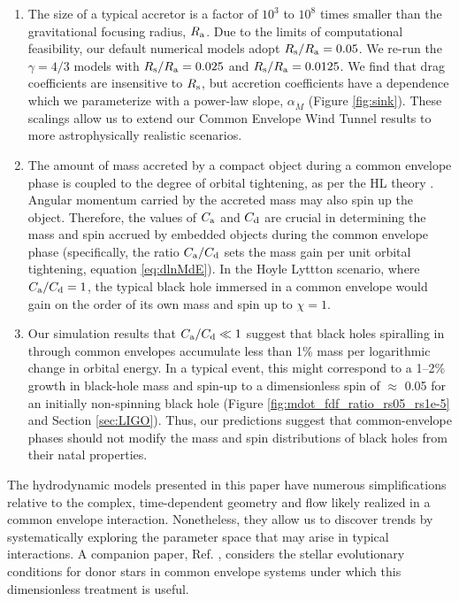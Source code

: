 \begin{enumerate}
\item The size of a typical accretor is a factor of $10^3$ to $10^8$ times smaller than the gravitational focusing radius, $R_{\rm a}$. Due to the limits of computational feasibility, our default numerical models adopt $R_{\rm s}/ R_{\rm a}=0.05$. We re-run the $\gamma=4/3$ models with $R_{\rm s}/ R_{\rm a}=0.025$ and $R_{\rm s}/ R_{\rm a}=0.0125$. We find that drag coefficients are insensitive to $R_{\rm s}$, but accretion coefficients have a dependence which we parameterize with a power-law slope, $\alpha_{\dot M}$ (Figure \ref{fig:sink}).
These scalings allow us to extend our Common Envelope Wind Tunnel results to more astrophysically realistic scenarios.

\item The amount of mass accreted by a compact object during a common envelope phase is coupled to the degree of orbital tightening, as per the HL theory \cite[and Section \ref{sec:coupled}]{Chevalier:1993,Brown:1995,Bethe:1998}. Angular momentum carried by the accreted mass may also spin up the object. Therefore, the values of $C_{\rm a}$ and $C_{\rm d}$ are crucial in determining the mass and spin accrued by embedded objects during the common envelope phase (specifically, the ratio $C_{\rm a}/C_{\rm d}$ sets the mass gain per unit orbital tightening, equation \eqref{eq:dlnMdE}). In the Hoyle Lyttton scenario, where $C_{\rm a}/C_{\rm d}=1$, the typical black hole immersed in a common envelope would gain on the order of its own mass and spin up to $\chi=1$.

\item Our simulation results that $C_{\rm a}/C_{\rm d} \ll 1$ suggest that black holes spiralling in through common envelopes accumulate less than 1\% mass per logarithmic change in orbital energy. In a typical event, this might correspond to a 1--2\% growth in black-hole mass and spin-up to a dimensionless spin of $\approx$ 0.05 for an initially non-spinning black hole (Figure \ref{fig:mdot_fdf_ratio_rs05_rs1e-5} and Section \ref{sec:LIGO}). Thus, our predictions suggest that common-envelope phases should not modify the mass and spin distributions of black holes from their natal properties.
\vspace{0.5cm}
\end{enumerate}

The hydrodynamic models presented in this paper have numerous simplifications relative to the complex, time-dependent geometry and flow likely realized in a common envelope interaction. Nonetheless, they allow us to discover trends by systematically exploring the parameter space that may arise in typical interactions. A companion paper, Ref. \cite{Rosa:2020}, considers the stellar evolutionary conditions for donor stars in common envelope systems under which this dimensionless treatment is useful. 

